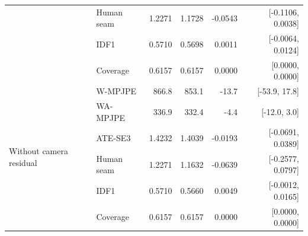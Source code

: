 \begin{table}[t]
\begin{tabular}{llrrrr}
      & Human seam & 1.2271 & 1.1728 & -0.0543 & [-0.1106, 0.0038] \\
      & IDF1 & 0.5710 & 0.5698 & 0.0011 & [-0.0064, 0.0124] \\
      & Coverage & 0.6157 & 0.6157 & 0.0000 & [0.0000, 0.0000] \\
    \midrule
    \multirow{6}{*}{Without camera residual}
      & W-MPJPE & 866.8 & 853.1 & -13.7 & [-53.9, 17.8] \\
      & WA-MPJPE & 336.9 & 332.4 & -4.4 & [-12.0, 3.0] \\
      & ATE-SE3 & 1.4232 & 1.4039 & -0.0193 & [-0.0691, 0.0389] \\
      & Human seam & 1.2271 & 1.1632 & -0.0639 & [-0.2577, 0.0797] \\
      & IDF1 & 0.5710 & 0.5660 & 0.0049 & [-0.0012, 0.0165] \\
      & Coverage & 0.6157 & 0.6157 & 0.0000 & [0.0000, 0.0000] \\
    \bottomrule
  \end{tabular}
\end{table}

